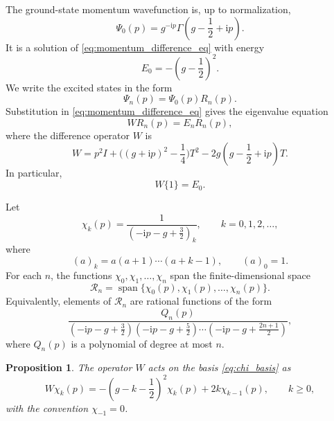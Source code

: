 \documentclass[11pt,reqno]{amsart}
\newcommand{\ii}{\mathrm{i}}
\newcommand{\cR}{\mathcal{R}}
\numberwithin{equation}{section}
\newtheorem{proposition}[theorem]{Proposition}
\begin{document}
The ground-state momentum wavefunction is, up to normalization,
\begin{equation}
  \Psi_0(p)=g^{-\ii p}\Gamma\!\left(g-\frac12+\ii p\right).
  \label{eq:ground_state}
\end{equation}
It is a solution of \eqref{eq:momentum_difference_eq} with energy
\begin{equation}
  E_0=-\left(g-\frac12\right)^2.
\end{equation}
We write the excited states in the form
\begin{equation}
  \Psi_n(p)=\Psi_0(p)R_n(p).
  \label{eq:factorization}
\end{equation}
Substitution in \eqref{eq:momentum_difference_eq} gives the eigenvalue equation
\begin{equation}
  W R_n(p)=E_n R_n(p),
  \label{eq:W_eigenvalue}
\end{equation}
where the difference operator $W$ is
\begin{equation}
  W=p^2I+\bigl((g+\ii p)^2-\frac14\bigr)T^2
  -2g\left(g-\frac12+\ii p\right)T.
  \label{eq:W_operator}
\end{equation}
In particular,
\begin{equation}
  W\{1\}=E_0.
\end{equation}

Let
\begin{equation}
  \chi_k(p)=\frac{1}{\left(-\ii p-g+\frac32\right)_k},
  \qquad k=0,1,2,\dots,
  \label{eq:chi_basis}
\end{equation}
where
\begin{equation}
  (a)_k=a(a+1)\cdots(a+k-1),
  \qquad (a)_0=1.
\end{equation}
For each $n$, the functions $\chi_0,\chi_1,\dots,\chi_n$ span the finite-dimensional space
\begin{equation}
  \cR_n=\operatorname{span}\{\chi_0(p),\chi_1(p),\dots,\chi_n(p)\}.
\end{equation}
Equivalently, elements of $\cR_n$ are rational functions of the form
\begin{equation}
  \frac{Q_n(p)}{
  \left(-\ii p-g+\frac32\right)
  \left(-\ii p-g+\frac52\right)
  \cdots
  \left(-\ii p-g+\frac{2n+1}{2}\right)},
  \label{eq:rational_flag}
\end{equation}
where $Q_n(p)$ is a polynomial of degree at most $n$.

\begin{proposition}\label{prop:bidiagonal}
The operator $W$ acts on the basis \eqref{eq:chi_basis} as
\begin{equation}
  W\chi_k(p)=
  -\left(g-k-\frac12\right)^2\chi_k(p)+2k\chi_{k-1}(p),
  \qquad k\ge 0,
  \label{eq:bidiagonal_action}
\end{equation}
with the convention $\chi_{-1}=0$.
\end{proposition}
\end{document}
